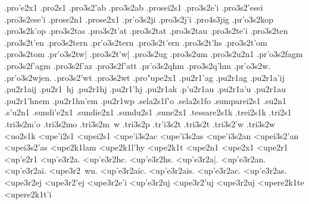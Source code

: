 {.pro'e2x1 		%
.pro2s1
	.pro3s2'ab 		%
	.pro3s2ab
.prosei2s1 		%
	.pro3s2e'i 		%
	.pro3s2'esei
	.pro3s2ese'i
.prose2n1 		%
.prose2x1 		%
	.pr'o3s2ji 		%
	.pro3s2j'i
		.pro4s3jig 		%
	.pr'o3s2kop 		%
	.pro3s2k'op 
	.pro3s2tas 		%
	.pro3s2t'at 		%
	.pro3s2tat 		%
	.pro3s2tau 		%
	.pro3s2te'i 		%
	.pro3s2ten 		%
	.pro3s2t'en 		%
	.pro3s2tern 		%
	.pr'o3s2tern 		%
	.pro3s2t'ern
	.pro3s2t'hs 		%
	.pro3s2t'om 		%
	.pro3s2tom
	.pr'o3s2tw|		%
	.pro3s2t'w|
	.pro3s2ug 		%
	.pro3s2um 		%
	.pro3s2u2n1 		%
	.pr'o3s2fagm 		%
	.pro3s2f'agm 
	.pro3s2f'az 		%
	.pro3s2f'att 		%
	.pr'o3s2qhm 		%
	.pro3s2q'hm
	.pr'o3s2w.
	.pr'o3s2wjen.
	.pro3s2'wt 		%
	.pro3s2wt
.pro"upe2x1 		%
.pu2r1'ag		%
.pu2r1ag
.pu2r1a'ij   		%
.pu2r1aij		%
.pu2r1~hj 		%
.pu2r1hj 		%
.pu2r1'hj 		%
.pu2r1ak   		%
.p'u2r1au		%
.pu2r1a'u
.pu2r1au 		%
.pu2r1'hnem 		%
.pu2r1hn'em
.pu2r1wp 		%
.sela2s1f'o		%
.sela2s1fo
.sumparei2s1 		%
.su2n1
.s'u2n1	   		%
.sundi'e2x1 		%
.sundie2x1 		%
.sundu2s1 		%
.sune2x1 		%
.tessare2s1k 		%
.trei2s1k 		%
.tri2s1
	.tri3s2m'o 		%
	.tri3s2mo
	.tri3s2m~w
	.tri3s2p 		%
	.tr'i3s2t 		%
	.tri3s2t
	.tri3s2'w 		%
	.tri3s2w
<uo2s1k 		%
<upe'i2s1
<upei2s1
	<upe'i3s2ac 		%
	<upe'i3s2as
	<upe'i3s2an
	<upei3s2'an
	<upei3s2'as
<upe2k1lam  		%
<upe2k1l'hy  		%
<upe2k1t    		%
<upe2n1
<upe2x1
<upe2r1
<up'e2r1
	<up'e3r2a.		%
	<up'e3r2hc.
	<up'e3r2hs.
	<up'e3r2a|.
	<up'e3r2an.
	<up'e3r2ai.
	<upe3r2~wn.
	<up'e3r2aic.
	<up'e3r2ais.
	<up'e3r2ac.
	<up'e3r2as. 
	<upe3r2ej		%
	<upe3r2'ej
	<upe3r2e'i		%
	<up'e3r2uj		%
	<upe3r2'uj
	<upe3r2uj		%
<upere2k1te 		%
<upere2k1t'i 		%
}
